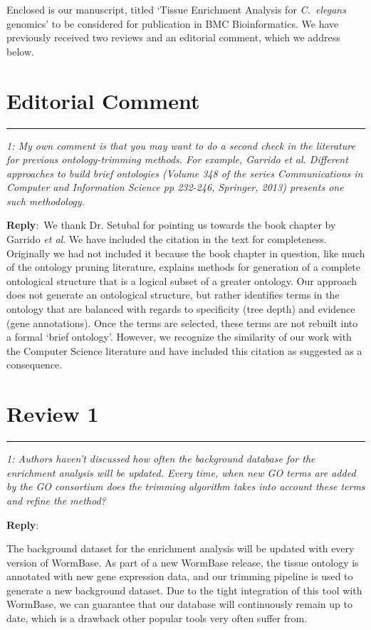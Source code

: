 \documentclass[12pt,stdletter,orderfromtodate,sigleft]{newlfm}
\newcommand{\pointRaised}[2]{\medskip \hrule \noindent 
                \textsl{{\fontseries{b} #1}: #2}}
\newcommand{\reply}{\noindent \textbf{Reply}:\ }
\begin{document}
\begin{newlfm}

 Enclosed is our manuscript, titled `Tissue Enrichment Analysis for \emph{C.~elegans} genomics' to be considered for publication in BMC Bioinformatics. We have previously received two reviews and an editorial comment, which we address below. 


\section{Editorial Comment}
 \pointRaised{1}{My own comment is that you may want to do a second check in the literature for previous ontology-trimming methods. For example, Garrido et al. Different approaches to build brief ontologies (Volume 348 of the series Communications in Computer and Information Science pp 232-246, Springer, 2013) presents one such methodology. }
 
 \reply{We thank Dr. Setubal for pointing us towards the book chapter by Garrido \emph{et al}. We have included the citation in the text for completeness. Originally we had not included it because the book chapter in question, like much of the ontology pruning literature, explains methods for generation of a complete ontological structure that is a logical subset of a greater ontology. Our approach does not generate an ontological structure, but rather identifies terms in the ontology that are balanced with regards to specificity (tree depth) and evidence (gene annotations). Once the terms are selected, these terms are not rebuilt into a formal `brief ontology'. However, we recognize the similarity of our work with the Computer Science literature and have included this citation as suggested as a consequence. 
  }


\section{Review 1}

\pointRaised{1}{Authors haven’t discussed how often the background database for the enrichment analysis will be updated. Every time, when new GO terms are added by the GO consortium does the trimming algorithm takes into account these terms and refine the method?
}

\reply{The background dataset for the enrichment analysis will be updated with every version of WormBase. As part of a new WormBase release, the tissue ontology is annotated with new gene expression data, and our trimming pipeline is used to generate a new background dataset. Due to the tight integration of this tool with WormBase, we can guarantee that our database will continuously remain up to date, which is a drawback other popular tools very often suffer from. 

}
\end{newlfm}
\end{document}
